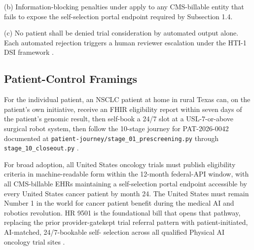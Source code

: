(b) Information-blocking penalties under
\cite{federal_register_info_blocking_disincentives_2024} apply to any
CMS-billable entity that fails to expose the self-selection portal
endpoint required by Subsection 1.4.

(c) No patient shall be denied trial consideration by automated
output alone. Each automated rejection triggers a human reviewer
escalation under the HTI-1 DSI framework
\cite{rank9_onc_hti1_2023, hti1_dsi_fact_sheet_2023}.

\subsection{Patient-Control Framings}

\hspace{0.5cm}  For the individual patient, an NSCLC patient at home in rural Texas
can, on the patient's own initiative, receive an FHIR eligibility
report within seven days of the patient's genomic result, then
self-book a 24/7 slot at a USL-7-or-above surgical robot system, then
follow the 10-stage journey for PAT-2026-0042 documented at
\texttt{patient-journey/stage\_01\_prescreening.py} through
\texttt{stage\_10\_closeout.py} \cite{kawchak_2026_19119939}.

For broad adoption, all United States oncology trials must publish
eligibility criteria in machine-readable form within the 12-month
federal-API window, with all CMS-billable EHRs maintaining a self-selection portal endpoint accessible by every United States cancer
patient by month 24. The United States must remain Number 1 in the
world for cancer patient benefit during the medical AI and robotics
revolution. HR 9501 is the foundational bill that opens that
pathway, replacing the prior provider-gatekept trial referral
pattern with patient-initiated, AI-matched, 24/7-bookable self-
selection across all qualified Physical AI oncology trial sites
\cite{kawchak_2026_19994945, kawchak_2026_19119939,
rank2_clinical_treatment_act_2020}.
